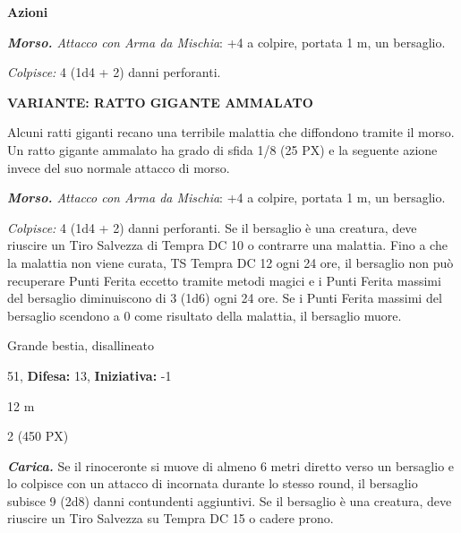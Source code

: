 \begin{multicols}{2}
{\textbf{Azioni}

\emph{\textbf{Morso.} Attacco con Arma da Mischia}: +4 a colpire, portata 1 m, un bersaglio.

\emph{Colpisce:} 4 (1d4 + 2) danni perforanti.

\medskip

\textbf{VARIANTE: RATTO GIGANTE AMMALATO}
\hypertarget{Ratto Gigante ammalato}{}

Alcuni ratti giganti recano una terribile malattia che diffondono tramite il morso. Un ratto gigante ammalato ha grado di sfida 1/8 (25 PX) e la seguente azione invece del suo normale attacco di morso.

\emph{\textbf{Morso.} Attacco con Arma da Mischia}: +4 a colpire, portata 1 m, un bersaglio.

\emph{Colpisce:} 4 (1d4 + 2) danni perforanti. Se il bersaglio è una creatura, deve riuscire un Tiro Salvezza di Tempra DC 10 o contrarre una malattia. Fino a che la malattia non viene curata, TS Tempra DC 12 ogni 24 ore, il bersaglio non può recuperare Punti Ferita eccetto tramite metodi magici e i Punti Ferita massimi del bersaglio diminuiscono di 3 (1d6) ogni 24 ore. Se i Punti Ferita massimi del bersaglio scendono a 0 come risultato della malattia, il bersaglio muore.

\begin{description}[noitemsep, topsep=0pt, parsep=0pt, partopsep=0pt, leftmargin=0cm, labelwidth=2.2cm]
    \item[\textbf{Taglia/Tipo:}] Grande bestia, disallineato
    \item[\textbf{Caratt.:}] 
    \item[\textbf{Punti Ferita:}] 51,  \textbf{Difesa:} 13,  \textbf{Iniziativa:} -1
    \item[\textbf{Tiri Salvez.:}] 
    \item[\textbf{Movimento:}] 12 m
    \item[\textbf{Sfida:}] 2 (450 PX)\smallskip
\end{description}

\emph{\textbf{Carica.}} Se il rinoceronte si muove di almeno 6 metri diretto verso un bersaglio e lo colpisce con un attacco di incornata durante lo stesso round, il bersaglio subisce 9 (2d8) danni contundenti aggiuntivi. Se il bersaglio è una creatura, deve riuscire un Tiro Salvezza su Tempra DC 15 o cadere prono.

}
\end{multicols}
